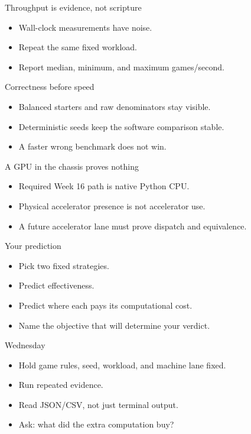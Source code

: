 \documentclass{beamer}
\begin{document}
\begin{frame}{Throughput is evidence, not scripture}
\begin{itemize}
\item Wall-clock measurements have noise.
\item Repeat the same fixed workload.
\item Report median, minimum, and maximum games/second.
\end{itemize}
\end{frame}

\begin{frame}{Correctness before speed}
\begin{itemize}
\item Balanced starters and raw denominators stay visible.
\item Deterministic seeds keep the software comparison stable.
\item A faster wrong benchmark does not win.
\end{itemize}
\end{frame}

\begin{frame}{A GPU in the chassis proves nothing}
\begin{itemize}
\item Required Week 16 path is native Python CPU.
\item Physical accelerator presence is not accelerator use.
\item A future accelerator lane must prove dispatch and equivalence.
\end{itemize}
\end{frame}

\begin{frame}{Your prediction}
\begin{itemize}
\item Pick two fixed strategies.
\item Predict effectiveness.
\item Predict where each pays its computational cost.
\item Name the objective that will determine your verdict.
\end{itemize}
\end{frame}

\begin{frame}{Wednesday}
\begin{itemize}
\item Hold game rules, seed, workload, and machine lane fixed.
\item Run repeated evidence.
\item Read JSON/CSV, not just terminal output.
\item Ask: what did the extra computation buy?
\end{itemize}
\end{frame}
\end{document}

